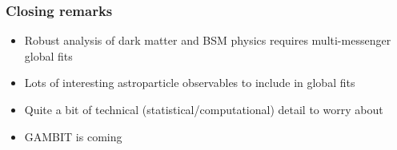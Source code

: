 \documentclass[xcolor=dvipsnames]{beamer}
\begin{document}
\begin{frame}
\frametitle{Closing remarks}

\begin{itemize}
\item{Robust analysis of dark matter and BSM physics requires multi-messenger global fits}
\item{Lots of interesting astroparticle observables to include in global fits}
\item{Quite a bit of technical (statistical/computational) detail to worry about}
\item{GAMBIT is coming}
\end{itemize}


\end{frame}
\end{document}
